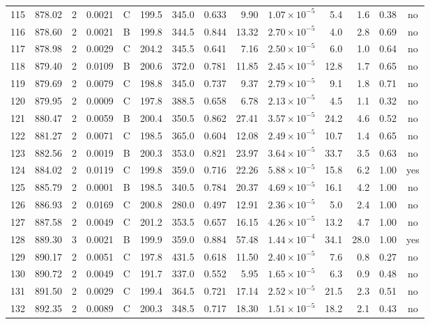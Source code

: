\begin{landscape}
\begin{longtable}{rrrrlrrrrrrrrc}
115 & 878.02 & 2 & 0.0021 & C & 199.5 & 345.0 & 0.633 & 9.90 & $1.07\times10^{-5}$ & 5.4 & 1.6 & 0.38 & no \\
116 & 878.60 & 2 & 0.0021 & B & 199.8 & 344.5 & 0.844 & 13.32 & $2.70\times10^{-5}$ & 4.0 & 2.8 & 0.69 & no \\
117 & 878.98 & 2 & 0.0029 & C & 204.2 & 345.5 & 0.641 & 7.16 & $2.50\times10^{-5}$ & 6.0 & 1.0 & 0.64 & no \\
118 & 879.40 & 2 & 0.0109 & B & 200.6 & 372.0 & 0.781 & 11.85 & $2.45\times10^{-5}$ & 12.8 & 1.7 & 0.65 & no \\
119 & 879.69 & 2 & 0.0079 & C & 198.8 & 345.0 & 0.737 & 9.37 & $2.79\times10^{-5}$ & 9.1 & 1.8 & 0.71 & no \\
120 & 879.95 & 2 & 0.0009 & C & 197.8 & 388.5 & 0.658 & 6.78 & $2.13\times10^{-5}$ & 4.5 & 1.1 & 0.32 & no \\
121 & 880.47 & 2 & 0.0059 & B & 200.4 & 350.5 & 0.862 & 27.41 & $3.57\times10^{-5}$ & 24.2 & 4.6 & 0.52 & no \\
122 & 881.27 & 2 & 0.0071 & C & 198.5 & 365.0 & 0.604 & 12.08 & $2.49\times10^{-5}$ & 10.7 & 1.4 & 0.65 & no \\
123 & 882.56 & 2 & 0.0019 & B & 200.3 & 353.0 & 0.821 & 23.97 & $3.64\times10^{-5}$ & 33.7 & 3.5 & 0.63 & no \\
124 & 884.02 & 2 & 0.0119 & C & 199.8 & 359.0 & 0.716 & 22.26 & $5.88\times10^{-5}$ & 15.8 & 6.2 & 1.00 & yes \\
125 & 885.79 & 2 & 0.0001 & B & 198.5 & 340.5 & 0.784 & 20.37 & $4.69\times10^{-5}$ & 16.1 & 4.2 & 1.00 & no \\
126 & 886.93 & 2 & 0.0169 & C & 200.8 & 280.0 & 0.497 & 12.91 & $2.36\times10^{-5}$ & 5.0 & 2.4 & 1.00 & no \\
127 & 887.58 & 2 & 0.0049 & C & 201.2 & 353.5 & 0.657 & 16.15 & $4.26\times10^{-5}$ & 13.2 & 4.7 & 1.00 & no \\
128 & 889.30 & 3 & 0.0021 & B & 199.9 & 359.0 & 0.884 & 57.48 & $1.44\times10^{-4}$ & 34.1 & 28.0 & 1.00 & yes \\
129 & 890.17 & 2 & 0.0051 & C & 197.8 & 431.5 & 0.618 & 11.50 & $2.40\times10^{-5}$ & 7.6 & 0.8 & 0.27 & no \\
130 & 890.72 & 2 & 0.0049 & C & 191.7 & 337.0 & 0.552 & 5.95 & $1.65\times10^{-5}$ & 6.3 & 0.9 & 0.48 & no \\
131 & 891.50 & 2 & 0.0029 & C & 199.4 & 364.5 & 0.721 & 17.14 & $2.52\times10^{-5}$ & 21.5 & 2.3 & 0.51 & no \\
132 & 892.35 & 2 & 0.0089 & C & 200.3 & 348.5 & 0.717 & 18.30 & $1.51\times10^{-5}$ & 18.2 & 2.1 & 0.43 & no \\

\end{longtable}
\end{landscape}
